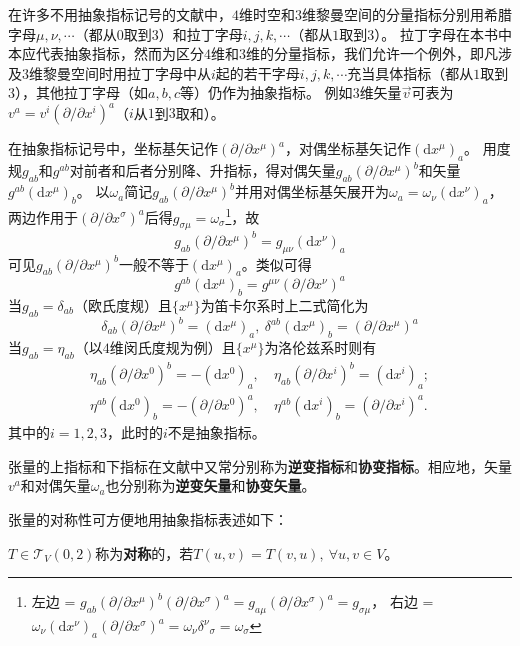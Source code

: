 在许多不用抽象指标记号的文献中，$4$维时空和$3$维黎曼空间的分量指标分别用希腊字母$\mu, \nu, \cdots$（都从$0$取到$3$）和拉丁字母$i, j, k, \cdots$（都从$1$取到$3$）。
拉丁字母在本书中本应代表抽象指标，然而为区分$4$维和$3$维的分量指标，我们允许一个例外，即凡涉及$3$维黎曼空间时用拉丁字母中从$i$起的若干字母$i, j, k, \cdots$充当具体指标（都从$1$取到$3$），其他拉丁字母（如$a, b, c$等）仍作为抽象指标。
例如$3$维矢量$\vec{v}$可表为$v^a = v^i(\partial / \partial x^i)^a$（$i$从$1$到$3$取和）。

在抽象指标记号中，坐标基矢记作$(\partial / \partial x^\mu)^a$，对偶坐标基矢记作$(\mathrm{d}x^\mu)_a$。
用度规$g_{ab}$和$g^{ab}$对前者和后者分别降、升指标，得对偶矢量$g_{ab}(\partial / \partial x^\mu)^b$和矢量$g^{ab}(\mathrm{d}x^\mu)_b$。
以$\omega_a$简记$g_{ab}(\partial / \partial x^\mu)^b$并用对偶坐标基矢展开为$\omega_a = \omega_\nu(\mathrm{d}x^\nu)_a$，两边作用于$(\partial / \partial x^\sigma)^a$后得$g_{\sigma\mu} = \omega_\sigma$\footnote{
左边 = $g_{ab}(\partial / \partial x^\mu)^b(\partial / \partial x^\sigma)^a = g_{a\mu}(\partial / \partial x^\sigma)^a = g_{\sigma\mu}$，
右边 = $\omega_\nu(\mathrm{d}x^\nu)_a(\partial / \partial x^\sigma)^a = \omega_\nu\delta^\nu{}_\sigma = \omega_\sigma$
}，故
$$g_{ab}(\partial / \partial x^\mu)^b = g_{\mu\nu}(\mathrm{d}x^\nu)_a$$
可见$g_{ab}(\partial / \partial x^\mu)^b$一般不等于$(\mathrm{d}x^\mu)_a$。类似可得
$$g^{ab}(\mathrm{d}x^\mu)_b = g^{\mu\nu}(\partial / \partial x^\nu)^a$$
当$g_{ab} = \delta_{ab}$（欧氏度规）且$\{x^\mu\}$为笛卡尔系时上二式简化为
$$\delta_{ab}(\partial / \partial x^\mu)^b = (\mathrm{d}x^\mu)_a, ~ \delta^{ab}(\mathrm{d}x^\mu)_b = (\partial / \partial x^\mu)^a$$
当$g_{ab} = \eta_{ab}$（以$4$维闵氏度规为例）且$\{x^\mu\}$为洛伦兹系时则有
$$\begin{aligned}
\eta_{ab}(\partial / \partial x^0)^b = -(\mathrm{d}x^0)_a, ~ & \eta_{ab}(\partial / \partial x^i)^b = (\mathrm{d}x^i)_a; \\
\eta^{ab}(\mathrm{d}x^0)_b = -(\partial / \partial x^0)^a, ~ & \eta^{ab}(\mathrm{d}x^i)_b = (\partial / \partial x^i)^a.
\end{aligned}$$
其中的$i = 1, 2, 3$，此时的$i$不是抽象指标。

张量的上指标和下指标在文献中又常分别称为\textbf{逆变指标}和\textbf{协变指标}。相应地，矢量$v^a$和对偶矢量$\omega_a$也分别称为\textbf{逆变矢量}和\textbf{协变矢量}。

张量的对称性可方便地用抽象指标表述如下：

\begin{definition}
$T \in \mathscr{T}_V(0, 2)$称为\textbf{对称}的，若$T(u, v) = T(v, u), ~ \forall u, v \in V$。
\end{definition}

